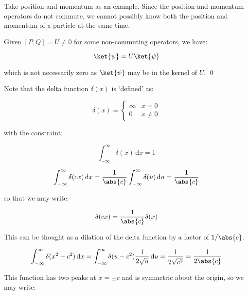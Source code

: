 \documentclass[12pt]{article}
\begin{document}
Take position and momentum as an example. Since the position and momentum operators do not commute, we cannot possibly know both the position and momentum of a particle at the same time.

Given $[P, Q] = U \ne 0$ for some non-commuting operators, we have:

\begin{equation}
    [P, Q] \ket{\psi} = U \ket{\psi}
\end{equation}

which is not necessarily zero as $\ket{\psi}$ may be in the kernel of $U$.
\qed


Note that the delta function $\delta(x)$ is `defined' as:

\begin{equation}
    \delta(x) = \begin{cases}
        \infty & x = 0 \\
        0 & x \ne 0
    \end{cases}
\end{equation}

with the constraint:

\begin{equation}
    \int_{-\infty}^{\infty} \delta(x) \, \mathrm{d}x = 1
\end{equation}


\begin{equation}
    \int_{-\infty}^{\infty} \delta(cx) \, \mathrm{d}x = \frac{1}{\abs{c}} \int_{-\infty}^{\infty} \delta(u) \, \mathrm{d}u = \frac{1}{\abs{c}}
\end{equation}

so that we may write:

\begin{equation}
    \delta(cx) = \frac{1}{\abs{c}} \delta(x)
\end{equation}

This can be thought as a dilation of the delta function by a factor of $1/\abs{c}$.


\begin{equation}
    \int_{-\infty}^{\infty} \delta(x^{2} - c^{2}) \, \mathrm{d}x = \int_{-\infty}^{\infty} \delta(u - c^{2}) \frac{1}{2\sqrt{u}} \, \mathrm{d}u = \frac{1}{2\sqrt{c^{2}}} = \frac{1}{2\abs{c}}
\end{equation}

This function has two peaks at $x = \pm c$ and is symmetric about the origin, so we may write:
\end{document}
